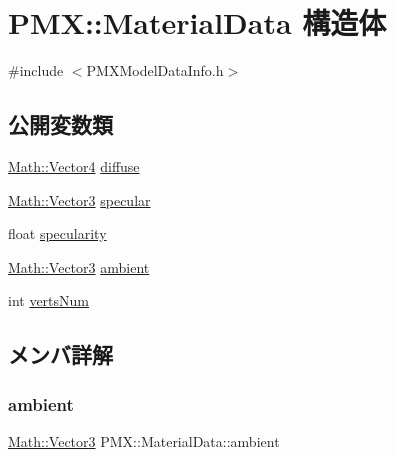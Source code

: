 \hypertarget{struct_p_m_x_1_1_material_data}{}\section{P\+MX\+:\+:Material\+Data 構造体}
\label{struct_p_m_x_1_1_material_data}


{\ttfamily \#include $<$P\+M\+X\+Model\+Data\+Info.\+h$>$}

\subsection*{公開変数類}
\begin{DoxyCompactItemize}
\item 
\mbox{\hyperlink{struct_math_1_1_vector4}{Math\+::\+Vector4}} \mbox{\hyperlink{struct_p_m_x_1_1_material_data_a7fcc76ff4712390ec488f91f88344aae}{diffuse}}
\item 
\mbox{\hyperlink{struct_math_1_1_vector3}{Math\+::\+Vector3}} \mbox{\hyperlink{struct_p_m_x_1_1_material_data_a5eb7c80c572c842ba3aac33a52602c3a}{specular}}
\item 
float \mbox{\hyperlink{struct_p_m_x_1_1_material_data_a95055a3cb5c3f10f2b9dfa0d38a77a81}{specularity}}
\item 
\mbox{\hyperlink{struct_math_1_1_vector3}{Math\+::\+Vector3}} \mbox{\hyperlink{struct_p_m_x_1_1_material_data_abc1dcfb57672669a2c1a275a44c9fea6}{ambient}}
\item 
int \mbox{\hyperlink{struct_p_m_x_1_1_material_data_a8b4f57bc8601af8b82ceb1dbb4938654}{verts\+Num}}
\end{DoxyCompactItemize}


\subsection{メンバ詳解}
\mbox{\label{struct_p_m_x_1_1_material_data_abc1dcfb57672669a2c1a275a44c9fea6}} 
\subsubsection{\texorpdfstring{ambient}{ambient}}
{\footnotesize\ttfamily \mbox{\hyperlink{struct_math_1_1_vector3}{Math\+::\+Vector3}} P\+M\+X\+::\+Material\+Data\+::ambient}

